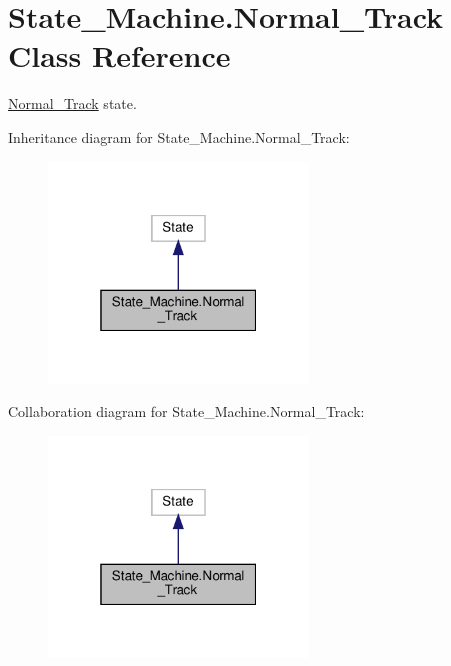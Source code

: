 \hypertarget{classState__Machine_1_1Normal__Track}{}\section{State\+\_\+\+Machine.\+Normal\+\_\+\+Track Class Reference}
\label{classState__Machine_1_1Normal__Track}


\hyperlink{classState__Machine_1_1Normal__Track}{Normal\+\_\+\+Track} state.  




Inheritance diagram for State\+\_\+\+Machine.\+Normal\+\_\+\+Track\+:
\nopagebreak
\begin{figure}[H]
\begin{center}
\leavevmode
\includegraphics[width=196pt]{classState__Machine_1_1Normal__Track__inherit__graph}
\end{center}
\end{figure}


Collaboration diagram for State\+\_\+\+Machine.\+Normal\+\_\+\+Track\+:
\nopagebreak
\begin{figure}[H]
\begin{center}
\leavevmode
\includegraphics[width=196pt]{classState__Machine_1_1Normal__Track__coll__graph}
\end{center}
\end{figure}
